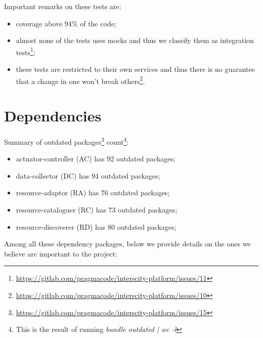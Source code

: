 \documentclass[paper=a4, fontsize=11pt]{scrartcl}
\numberwithin{equation}{section}    %
\numberwithin{figure}{section}      %
\numberwithin{table}{section}        %
\begin{document}
  \vspace{1em}

  Important remarks on these tests are:

  \begin{itemize}
    \item coverage above 94\% of the code;
    \item almost none of the tests uses mocks and thus we classify them as integration tests\footnote{\url{https://gitlab.com/pragmacode/interscity-platform/issues/11}};
    \item these tests are restricted to their own services and thus there is no guarantee that a change in one won't break others\footnote{\url{https://gitlab.com/pragmacode/interscity-platform/issues/10}}.
  \end{itemize}

\section{Dependencies}
  Summary of outdated packages\footnote{\url{https://gitlab.com/pragmacode/interscity-platform/issues/15}} count\footnote{This is the result of running \textit{bundle outdated | wc -l}}:

  \begin{itemize}
    \item actuator-controller (AC) has 92 outdated packages;
    \item data-collector (DC) has 94 outdated packages;
    \item resource-adaptor (RA) has 76 outdated packages;
    \item resource-cataloguer (RC) has 73 outdated packages;
    \item resource-discoverer (RD) has 80 outdated packages;
  \end{itemize}

  Among all these dependency packages, below we provide details on the ones we believe are important to the project:

  \vspace{1em}
\end{document}
